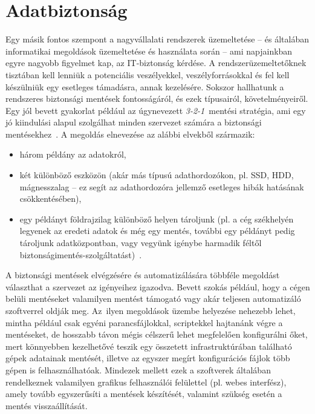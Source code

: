 \section{Adatbiztonság}
\label{sect:datasec}
Egy másik fontos szempont a nagyvállalati rendszerek üzemeltetése -- és általában informatikai megoldások üzemeltetése és használata során -- ami napjainkban egyre nagyobb figyelmet kap, az IT-biztonság kérdése. A rendszerüzemeltetőknek tisztában kell lenniük a potenciális veszélyekkel, veszélyforrásokkal és fel kell készülniük egy esetleges támadásra, annak kezelésére. Sokszor hallhatunk a rendszeres biztonsági mentések fontosságáról, és ezek típusairól, követelményeiről. Egy jól bevett gyakorlat például az úgynevezett \textit{\mbox{3-2-1}}~mentési stratégia, ami egy jó kiindulási alapul szolgálhat minden szervezet számára a biztonsági mentésekhez~\cite{Backblaze321}.
A megoldás elnevezése az alábbi elvekből származik:
\begin{itemize}
	\item három példány az adatokról,
	\item két különböző eszközön (akár más típusú adathordozókon, pl. SSD, HDD, mágnesszalag -- ez segít az adathordozóra jellemző esetleges hibák hatásának csökkentésében),
	\item egy példányt földrajzilag különböző helyen tároljunk (pl. a cég székhelyén legyenek az eredeti adatok és még egy mentés, további egy példányt pedig tároljunk adatközpontban, vagy vegyünk igénybe harmadik féltől biztonságimentés-szolgáltatást)~\cite{Seagate321}.
\end{itemize}

A biztonsági mentések elvégzésére és automatizálására többféle megoldást választhat a szervezet az igényeihez igazodva. Bevett szokás például, hogy a cégen belüli mentéseket valamilyen mentést támogató vagy akár teljesen automatizáló szoftverrel oldják meg. Az~ilyen megoldások üzembe helyezése nehezebb lehet, mintha például csak egyéni parancsfájlokkal, scriptekkel hajtanánk végre a mentéseket, de hosszabb távon mégis célszerű lehet megfelelően konfigurálni őket, mert könnyebben kezelhetővé teszik egy összetett infrastruktúrában található gépek adatainak mentését, illetve az egyszer megírt konfigurációs fájlok több gépen is felhasználhatóak. Mindezek mellett ezek a szoftverek általában rendelkeznek valamilyen grafikus felhasználói felülettel (pl. webes interfész), amely tovább egyszerűsíti a mentések készítését, valamint szükség esetén a mentés visszaállítását.


